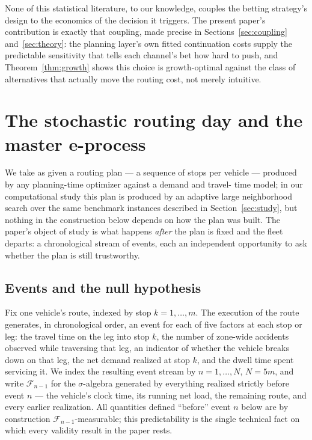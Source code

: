 \documentclass[trsc,dblanonrev]{informs4}
\newcommand{\F}{\mathcal{F}}
\begin{document}
None of this statistical literature, to our knowledge, couples the
betting strategy's design to the economics of the decision it
triggers. The present paper's contribution is exactly that coupling,
made precise in Sections~\ref{sec:coupling} and~\ref{sec:theory}: the
planning layer's own fitted continuation costs supply the predictable
sensitivity that tells each channel's bet how hard to push, and
Theorem~\ref{thm:growth} shows this choice is growth-optimal against
the class of alternatives that actually move the routing cost, not
merely intuitive.

\section{The stochastic routing day and the master e-process}\label{sec:model}

We take as given a routing plan --- a sequence of stops per vehicle ---
produced by any planning-time optimizer against a demand and travel-
time model; in our computational study this plan is produced by an
adaptive large neighborhood search over the same benchmark instances
described in Section~\ref{sec:study}, but nothing in the construction
below depends on how the plan was built.
The paper's object of study is what happens \emph{after} the plan is
fixed and the fleet departs: a chronological stream of events, each an
independent opportunity to ask whether the plan is still trustworthy.

\subsection{Events and the null hypothesis}

Fix one vehicle's route, indexed by stop $k = 1, \dots, m$. The
execution of the route generates, in chronological order, an event for
each of five factors at each stop or leg: the travel time on the leg
into stop $k$, the number of zone-wide accidents observed while
traversing that leg, an indicator of whether the vehicle breaks down on
that leg, the net demand realized at stop $k$, and the dwell time spent
servicing it. We index the resulting event stream by $n = 1, \dots,
N$, $N = 5m$, and write $\F_{n-1}$ for the $\sigma$-algebra generated by
everything realized strictly before event $n$ --- the vehicle's clock
time, its running net load, the remaining route, and every earlier
realization. All quantities defined ``before'' event $n$ below are by
construction $\F_{n-1}$-measurable; this predictability is the single
technical fact on which every validity result in the paper rests.
\end{document}
